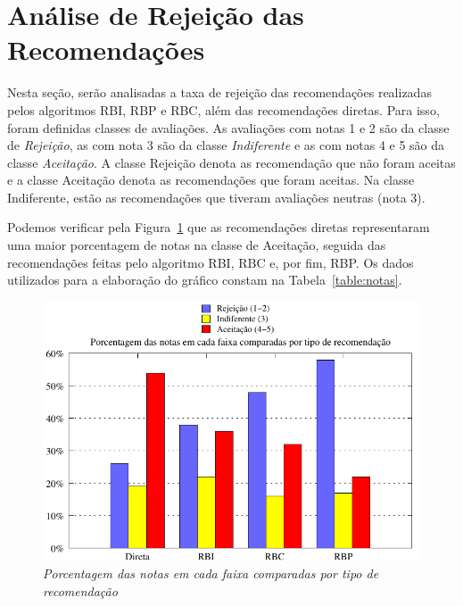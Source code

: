 
\section{Análise de Rejeição das Recomendações}
\label{sec:analise_de_rejeicao_das_recomendacoes}

 Nesta seção, serão analisadas a taxa de rejeição das recomendações realizadas pelos algoritmos RBI, RBP e RBC, além das recomendações diretas. Para isso, foram definidas classes de avaliações. As avaliações com notas 1 e 2 são da classe de \textit{Rejeição}, as com nota 3 são da classe \textit{Indiferente} e as com notas 4 e 5 são da classe \textit{Aceitação}. A classe Rejeição denota as recomendação que não foram aceitas e a classe Aceitação denota as recomendações que foram aceitas. Na classe Indiferente, estão as recomendações que tiveram avaliações neutras (nota 3).

 Podemos verificar pela Figura~\ref{fig:notas} que as recomendações diretas representaram uma maior porcentagem de notas na classe de Aceitação, seguida das recomendações feitas pelo algoritmo RBI, RBC e, por fim, RBP. Os dados utilizados para a elaboração do gráfico constam na Tabela~\ref{table:notas}.
 
\begin{figure}
    \centering
    \includegraphics[width=\textwidth]{imagens/grafico_notas}
    \caption{\it Porcentagem das notas em cada faixa comparadas por tipo de recomendação}
    \label{fig:notas}
\end{figure}

